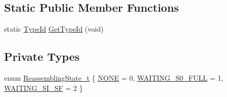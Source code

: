 \subsection*{Static Public Member Functions}
\begin{DoxyCompactItemize}
\item 
static \hyperlink{classns3_1_1TypeId}{Type\+Id} \hyperlink{classns3_1_1LteRlcUmLowLat_afcbc09793556f00ce2cd62cb0c9c670b}{Get\+Type\+Id} (void)
\end{DoxyCompactItemize}
\subsection*{Private Types}
\begin{DoxyCompactItemize}
\item 
enum \hyperlink{classns3_1_1LteRlcUmLowLat_a0681446b7b6191c38dbf0fc526a917bf}{Reassembling\+State\+\_\+t} \{ \hyperlink{classns3_1_1LteRlcUmLowLat_a0681446b7b6191c38dbf0fc526a917bfaf66456334269c17805066a4dbfbd6c73}{N\+O\+NE} = 0, 
\hyperlink{classns3_1_1LteRlcUmLowLat_a0681446b7b6191c38dbf0fc526a917bfafdaebb39f979eb77f3d0af57f310a880}{W\+A\+I\+T\+I\+N\+G\+\_\+\+S0\+\_\+\+F\+U\+LL} = 1, 
\hyperlink{classns3_1_1LteRlcUmLowLat_a0681446b7b6191c38dbf0fc526a917bfabc4f80a5f494c7e12558de2811e23a2d}{W\+A\+I\+T\+I\+N\+G\+\_\+\+S\+I\+\_\+\+SF} = 2
 \}
\end{DoxyCompactItemize}
